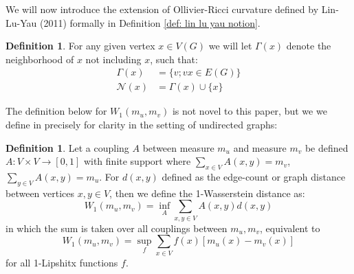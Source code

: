 \documentclass{Dissertate}
\theoremstyle{definition}
\theoremstyle{definition} %
\theoremstyle{definition}
\newtheorem{definition}[theorem]{Definition}
\begin{document}
We will now introduce the extension of Ollivier-Ricci curvature defined by Lin-Lu-Yau (2011) formally in Definition \ref{def: lin lu yau notion}. 
\begin{definition} For any given vertex $x \in V(G)$ we will let $\Gamma(x)$ denote the neighborhood of $x$ not including $x$, such that: 
\begin{align*}
    \Gamma (x) &= \{ v; vx \in E(G)\}\\
    \mathcal{N}(x) &= \Gamma (x) \cup \{x\}
\end{align*}
\end{definition}
The definition below for $W_1(m_u, m_v)$ is not novel to this paper, but we we define in precisely for clarity in the setting of undirected graphs: 
\begin{definition} Let a coupling $A$ between measure $m_u$ and measure $m_v$ be defined $A: V \times V \rightarrow [0,1]$ with finite support where $\sum_{x \in V} A(x,y) = m_v$, $\sum_{y \in V} A(x,y) = m_u$. For $d(x,y)$ defined as the edge-count or graph distance between vertices $x,y \in V$, then we define the 1-Wasserstein distance as: 
$$
W_1(m_u, m_v) = \inf_{A} \sum_{x,y \in V} A(x,y) d(x,y)
$$
in which the sum is taken over all couplings between $m_u, m_v$, equivalent to
$$
W_1(m_u, m_v) = \sup_{f} \sum_{x \in V} f(x) [m_u(x) - m_v(x)]
$$
for all 1-Lipshitx functions $f$.
\end{definition}
\end{document}
